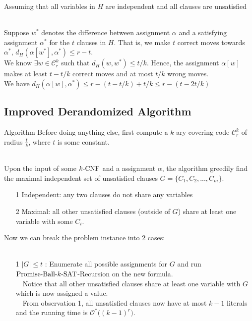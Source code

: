 \documentclass[pdf] {beamer}
\newcommand{\SAT}{\textnormal{$k$-SAT}}
\newcommand{\CNF}{\textnormal{$k$-CNF}}
\newcommand{\dist}[2]{d_H(#1,#2)}
\newcommand{\astar}{\alpha^*}
\newcommand{\PBS}{\textnormal{Promise-Ball-$\SAT$}}
\newcommand{\cc}{\mathcal{C}}
\renewcommand{\O}{\mathcal{O}^*}
\begin{document}
	\begin{frame}
	Assuming that all variables in $H$ are independent and all clauses are unsatisfied\\~\

	Suppose $w^*$ denotes the difference between assignment $\alpha$ and a satisfying assignment $\astar$ for the $t$ clauses in $H$. That is, we make $t$ correct moves towards $\astar$, $\dist{\alpha[w^*]}{\astar} \leq r - t$. \\
	We know $\exists w \in \cc_r^k$ such that $\dist{w}{w^*} \leq t/k$. Hence, the assignment $\alpha[w]$ makes at least $t - t/k$ correct moves and at most $t/k$ wrong moves.\\
	We have $\dist{\alpha[w]}{\astar} \leq r - (t - t/k) + t/k \leq r - (t-2t/k)$
\end{frame}
	\subsection{Improved Derandomized Algorithm}
	\begin{frame}{Algorithm}
	Before doing anything else, first compute a $k$-ary covering code $\cc_r^k$ of radius $\frac{t}{k}$, where $t$ is some constant. \\~\
	
	Upon the input of some $\CNF$ and a assignment $\alpha$, the algorithm greedily find the maximal independent set of unsatisfied clauses $G = \{C_1, C_2, ...,C_m\}$. \\
	\begin{enumerate}
		\item[1] Independent: any two clauses do not share any variables\\
		\item[2] Maximal: all other unsatisfied clauses (outside of $G$) share at least one variable with some $C_i$.
	\end{enumerate}
	Now we can break the problem instance into 2 cases: \\~\
	\end{frame}
	\begin{frame}
		\begin{enumerate}
			\item[1] $|G| \leq t$ : Enumerate all possible assignments for $G$ and run $\PBS$-Recursion on the new formula. \\~\
			Notice that all other unsatisfied clauses share at least one variable with $G$ which is now assigned a value. \\~\
			From observation 1, all unsatisfied clauses now have at most $k-1$ literals and the running time is $\O\big((k-1)^r\big)$.
		\end{enumerate}
	\end{frame}	
\end{document}
